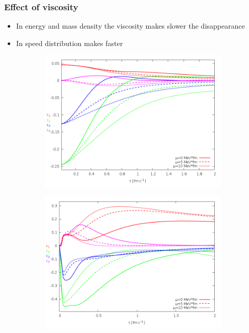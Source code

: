 \documentclass{beamer}
\begin{document}
\begin{frame}
\frametitle{Effect of viscosity}
\begin{center}
\begin{itemize}
\item In energy and mass density the viscosity makes slower the disappearance 
\item In speed distribution makes faster
\end{itemize}
\begin{figure}[H]
	\centering
    \begin{subfigure}[b]{0.49\textwidth}
    		\includegraphics[width=\textwidth]{pic/res/nonrel/eps_visc_r}
	\end{subfigure}
	\begin{subfigure}[b]{0.49\textwidth}
        	\includegraphics[width=\textwidth]{pic/res/nonrel/eps_visc_v}
	\end{subfigure}
\end{figure}
\end{center}
\end{frame}
\end{document}
